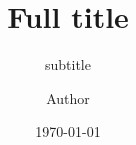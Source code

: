 \title[Short title]{Full title}
\subtitle{subtitle}
\author{Author}
\newcommand{\faculty}{Fakultät Informatik und Medien}
\newcommand{\university}{HTWK Leipzig}
\newcommand{\universityLong}{Hochschule für Technik, Wirtschaft und Kultur Leipzig}
\date{\today}





